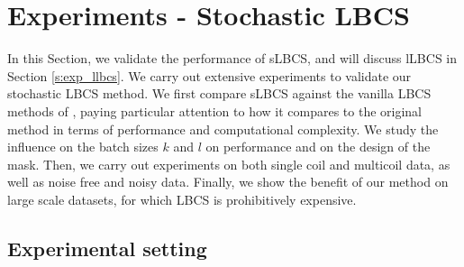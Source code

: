 \section{Experiments - Stochastic LBCS}\label{s:exp_slbcs}
In this Section, we validate the performance of sLBCS, and will discuss lLBCS in Section \ref{s:exp_llbcs}. We carry out extensive experiments to validate our stochastic LBCS method. We first compare sLBCS against the vanilla LBCS methods of \citet{gozcu2018learning}, paying particular attention to how it compares to the original method in terms of performance and computational complexity. We study the influence on the batch sizes $k$ and $l$ on performance and on the design of the mask. Then, we carry out experiments on both single coil and multicoil data, as well as noise free and noisy data. Finally, we show the benefit of our method on large scale datasets, for which LBCS is prohibitively expensive. 

\subsection{Experimental setting}


